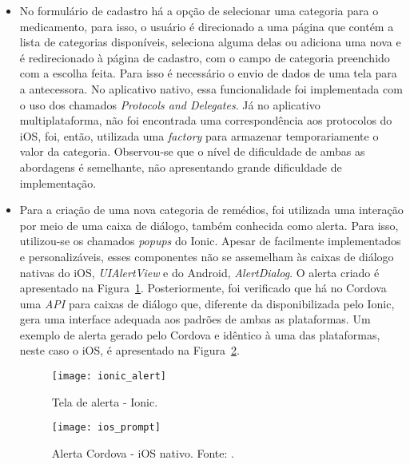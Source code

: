 \begin{itemize}
\begin{itemize}
		 	\item No formulário de cadastro há a opção de selecionar uma categoria para o medicamento, para isso, o usuário é direcionado a uma página que contém a lista de categorias disponíveis, seleciona alguma delas ou adiciona uma nova e é redirecionado à página de cadastro, com o campo de categoria preenchido com a escolha feita. Para isso é necessário o envio de dados de uma tela para a antecessora. No aplicativo nativo, essa funcionalidade foi implementada com o uso dos chamados \textit{Protocols and Delegates}. Já no aplicativo multiplataforma, não foi encontrada uma correspondência aos protocolos do iOS, foi, então, utilizada uma \textit{factory} para armazenar temporariamente o valor da categoria. Observou-se que o nível de dificuldade de ambas as abordagens é semelhante, não apresentando grande dificuldade de implementação.
			 
			\item Para a criação de uma nova categoria de remédios, foi utilizada uma interação por meio de uma caixa de diálogo, também conhecida como alerta. Para isso, utilizou-se os chamados \textit{popups} do Ionic.  Apesar de facilmente implementados e personalizáveis, esses componentes não se assemelham às caixas de diálogo nativas do iOS, \textit{UIAlertView} e do Android, \textit{AlertDialog}. O alerta criado é apresentado na Figura~\ref{fig:ionic_alert}. Posteriormente,  foi verificado que há no Cordova uma \textit{API} para caixas de diálogo que, diferente da disponibilizada pelo Ionic, gera uma interface adequada aos padrões de ambas as plataformas. Um exemplo de alerta  gerado pelo Cordova e idêntico à uma das plataformas, neste caso o iOS, é apresentado na Figura~\ref{fig:ios_prompt}.
			 	
			 	\begin{figure}[H]
			 		\centering
			 		\texttt{[image: ionic\_alert]}
			 		\caption[Tela de alerta - Ionic]{Tela de alerta - Ionic.}
			 		\label{fig:ionic_alert}
			 	\end{figure}
			 	
			 	\begin{figure}[H]
			 		\centering
			 		\texttt{[image: ios\_prompt]}
			 		\caption[Alerta Cordova - iOS nativo]{Alerta Cordova - iOS nativo. Fonte: \cite{framework_ngcordova_2016}.}
			 		\label{fig:ios_prompt}
			 	\end{figure}
			 	
			 	

\end{itemize}
\end{itemize}
